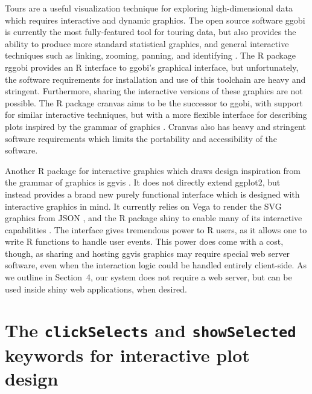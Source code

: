 \documentclass[journal]{vgtc}\usepackage[]{graphicx}\usepackage[]{color}
\begin{document}
Tours are a useful visualization technique for exploring high-dimensional data which requires interactive and dynamic graphics. The open source software ggobi is currently the most fully-featured tool for touring data, but also provides the ability to produce more standard statistical graphics, and general interactive techniques such as linking, zooming, panning, and identifying \citep{ggobi:2007}. The R package rggobi \citep{rggobi} provides an R interface to ggobi's graphical interface, but unfortunately, the software requirements for installation and use of this toolchain are heavy and stringent. Furthermore, sharing the interactive versions of these graphics are not possible. The R package cranvas aims to be the successor to ggobi, with support for similar interactive techniques, but with a more flexible interface for describing plots inspired by the grammar of graphics \citep{cranvas}. Cranvas also has heavy and stringent software requirements which limits the portability and accessibility of the software.

Another R package for interactive graphics which draws design inspiration from the grammar of graphics is ggvis \citep{ggvis}. It does not directly extend ggplot2, but instead provides a brand new purely functional interface which is designed with interactive graphics in mind. It currently relies on Vega to render the SVG graphics from JSON \citep{vega}, and the R package shiny to enable many of its interactive capabilities \citep{shiny}. The interface gives tremendous power to R users, as it allows one to write R functions to handle user events. This power does come with a cost, though, as sharing and hosting ggvis graphics may require special web server software, even when the interaction logic could be handled entirely client-side. As we outline in Section~4, our system does not require a web server, but can be used inside shiny web applications, when desired.

\section{The \texttt{clickSelects} and \texttt{showSelected} keywords for interactive
  plot design}
\label{sec:design}

\end{document}
